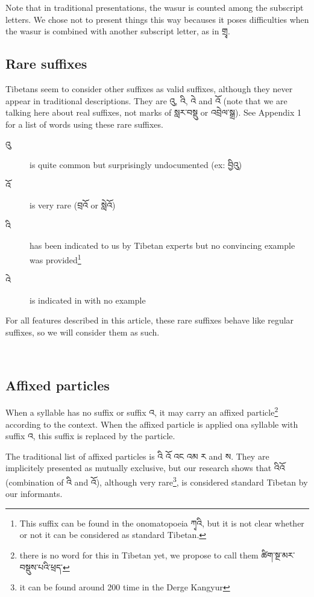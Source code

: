 \documentclass[%
a4paper,%
pagesize,%
12pt,%
parskip=off,%
bibliography=totoc,%
numbers=noenddot,%
DIV=12,%
twoside=semi,%
headings=normal%
]{scrartcl}
\begin{document}
Note that in traditional presentations, the wasur is counted among the subscript letters. We chose not to present things this way becauses it poses difficulties when the wasur is combined with another subscript letter, as in གྲྭ.

\subsection{Rare suffixes}

Tibetans seem to consider other suffixes as valid suffixes, although they never appear in traditional descriptions. They are འུ, འི, འེ and འོ (note that we are talking here about real suffixes, not marks of སླར་བསྡུ or འབྲེལ་སྒྲ). See Appendix 1 for a list of words using these rare suffixes.

\begin{description}
 \item[འུ] is quite common but surprisingly undocumented (ex: བྱིའུ)
 \item[འོ] is very rare (བྲའོ or སླེའོ)
 \item[འི] has been indicated to us by Tibetan experts but no convincing example was provided\footnote{This suffix can be found in the onomatopoeia ཀྭའི, but it is not clear whether or not it can be considered as standard Tibetan.}
 \item[འེ] is indicated in \cite{TournadreMST} with no example
\end{description}

For all features described in this article, these rare suffixes behave like regular suffixes, so we will consider them as such.

­\subsection{Affixed particles}

When a syllable has no suffix or suffix འ, it may carry an affixed particle\footnote{there is no word for this in Tibetan yet, we propose to call them ཚིག་སྔ་མར་བསྡུས་པའི་ཕྲད་} according to the context. When the affixed particle is applied ona syllable with suffix འ, this suffix is replaced by the particle.

The traditional list of affixed particles is འི འོ འང འམ ར and ས. They are implicitely presented as mutually exclusive, but our research shows that འིའོ (combination of འི and འོ), although very rare\footnote{it can be found around 200 time in the Derge Kangyur}, is considered standard Tibetan by our informants.
\end{document}
